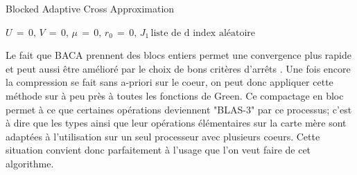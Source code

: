 \documentclass[10pt]{SelfArx} %
\begin{document}
\begin{algorithm}
    \caption{Blocked Adaptive Cross Approximation}
    
    
    $U \, = \, 0, \, V \, = \, 0, \, \mu \, = \, 0, \, r_0 \, = \, 0, \, J_1 \, \text{liste de d index aléatoire}$
    
        
    
    
\end{algorithm}


Le fait que BACA prennent des blocs entiers permet une convergence plus rapide et peut aussi être amélioré par le choix de bons critères d'arrêts \cite{liu_parallel_2020}.
Une fois encore la compression se fait sans a-priori sur le coeur, on peut donc appliquer cette méthode sur à peu près à toutes les fonctions de Green.
Ce compactage en bloc permet à ce que certaines opérations deviennent "BLAS-3" par ce processus; c'est à dire que les types ainsi que leur opérations élémentaires sur la carte mère sont adaptées à l'utilisation sur un seul processeur avec plusieurs coeurs. Cette situation convient donc parfaitement à l'usage que l'on veut faire de cet algorithme.
\end{document}
